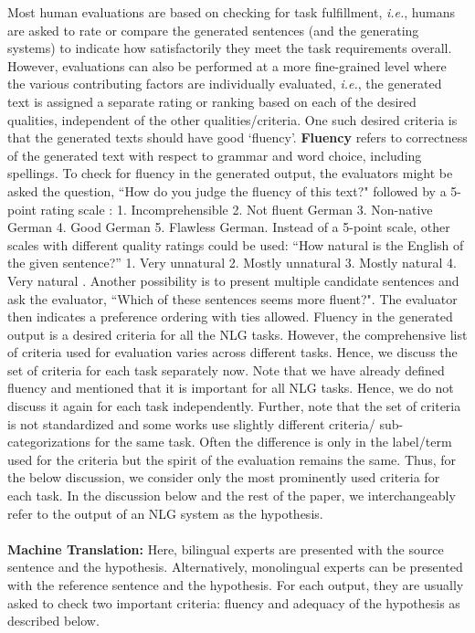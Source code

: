 Most human evaluations are based on checking for task fulfillment, \textit{i.e.}, humans are asked to rate or compare the generated sentences (and the generating systems) to indicate how satisfactorily they meet the task requirements overall. However, evaluations can also be performed at a more fine-grained level where the various contributing factors are individually evaluated, \textit{i.e.}, the generated text is assigned a separate rating or ranking based on each of the desired qualities, independent of the other qualities/criteria. 
One such desired criteria is that the generated texts should have good `fluency'.
\textbf{Fluency} refers to correctness of the generated text with respect to grammar and word choice, including spellings. 
To check for fluency in the generated output, the evaluators might be asked the question, ``How do you judge the fluency of this text?" followed by a 5-point rating scale :
1. Incomprehensible 2. Not fluent German 3. Non-native German 4. Good German 5. Flawless German.
Instead of a 5-point scale, other scales with different quality ratings could be used: ``How natural is the English of the given sentence?'' 1. Very unnatural 2. Mostly unnatural 3. Mostly natural 4. Very natural . 
Another possibility is to present multiple candidate sentences and ask the evaluator, ``Which of these sentences seems more fluent?". The evaluator then indicates a preference ordering with ties allowed. 
Fluency in the generated output is a desired criteria for all the NLG tasks. However, the comprehensive list of criteria used for evaluation varies across different tasks. Hence, we discuss the set of criteria for each task separately now. Note that we have already defined fluency and mentioned that it is important for all NLG tasks. Hence, we do not discuss it again for each task independently. Further, note that the set of criteria is not standardized and some works use slightly different criteria/ sub-categorizations for the same task. Often the difference is only in the label/term used for the criteria but the spirit of the evaluation remains the same. Thus, for the below discussion, we consider only the most prominently used criteria for each task. In the discussion below and the rest of the paper, we interchangeably refer to the output of an NLG system as the hypothesis. 
\\\\
\textbf{Machine Translation:} Here, bilingual experts are presented with the source sentence and the hypothesis. Alternatively, monolingual experts can be presented with the reference sentence and the hypothesis. For each output, they are usually asked to check two important criteria: fluency and adequacy of the hypothesis  as described below. 
